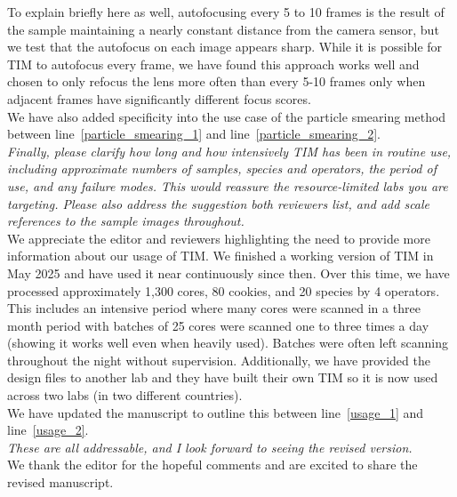 \documentclass[12pt,a4paper]{article}
\newcommand{\lr}[1]{line~\ref{#1}}
\begin{document}
To explain briefly here as well, autofocusing every 5 to 10 frames is the result of the sample maintaining a nearly constant distance from the camera sensor, but we test that the autofocus on each image appears sharp. While it is possible for TIM to autofocus every frame, we have found this approach works well and chosen to only refocus the lens more often than every 5-10 frames only when adjacent frames have significantly different focus scores. \\

We have also added specificity into the use case of the particle smearing method between \lr{particle_smearing_1} and \lr{particle_smearing_2}. \\

\emph{Finally, please clarify how long and how intensively TIM has been in routine use, including approximate numbers of samples, species and operators, the period of use, and any failure modes. This would reassure the resource-limited labs you are targeting. Please also address the suggestion both reviewers list, and add scale references to the sample images throughout.} \\

We appreciate the editor and reviewers highlighting the need to provide more information about our usage of TIM. We finished a working version of TIM in May 2025 and have used it near continuously since then. Over this time, we have processed approximately 1,300 cores, 80 cookies, and 20 species by 4 operators. This includes an intensive period where many cores were scanned in a three month period with batches of 25 cores were scanned one to three times a day (showing it works well even when heavily used). Batches were often left scanning throughout the night without supervision. Additionally, we have provided the design files to another lab and they have built their own TIM so it is now used across two labs (in two different countries). \\

We have updated the manuscript to outline this between \lr{usage_1} and \lr{usage_2}. \\

\emph{These are all addressable, and I look forward to seeing the revised version.} \\

We thank the editor for the hopeful comments and are excited to share the revised manuscript. \\

\end{document}
